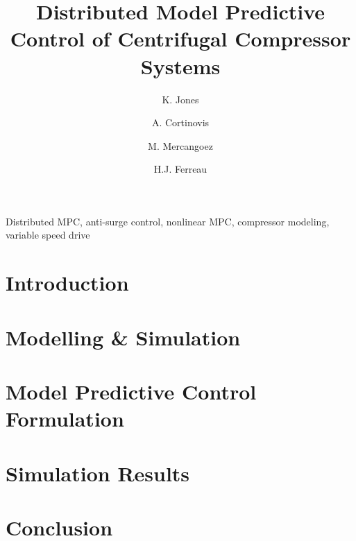 \documentclass{ifacconf}
\newcommand{\mysec}[1]{%
  \vspace{-0.3ex}
  \section{#1}
  \vspace{-1.2ex}
}
\begin{document}
\begin{frontmatter}

\title{Distributed Model Predictive Control of Centrifugal Compressor Systems} 


\author[First]{K. Jones} 
\author[First]{A. Cortinovis} 
\author[First]{M. Mercangoez}
\author[First]{H.J. Ferreau}

\address[First]{ABB Switzerland Ltd., Corporate Research, Baden-Dättwil, Switzerland (e-mail: katie.jones@reactive-robotics.com, andrea.cortinovis@ch.abb.com, mehmet.mercangoez@ch.abb.com, joachim.ferreau@ch.abb.com).}

\begin{abstract}                %
  
\end{abstract}

\begin{keyword}
  Distributed MPC, anti-surge control, nonlinear MPC, compressor modeling, variable speed drive
\end{keyword}

\end{frontmatter}

\mysec{Introduction}


\mysec{Modelling \& Simulation}


\mysec{Model Predictive Control Formulation}


\mysec{Simulation Results}


\mysec{Conclusion}

\vspace{-0.1cm}
\vskip 0pt

\end{document}
